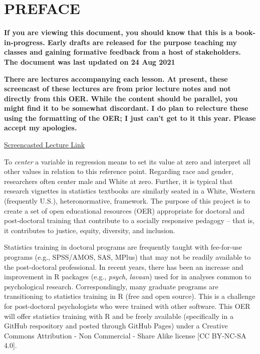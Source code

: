 \documentclass[
  english,
]{book}
\begin{document}
\hypertarget{preface}{%
\chapter*{PREFACE}\label{preface}}

\textbf{If you are viewing this document, you should know that this is a book-in-progress. Early drafts are released for the purpose teaching my classes and gaining formative feedback from a host of stakeholders. The document was last updated on 24 Aug 2021}

\textbf{There are lectures accompanying each lesson. At present, these screencast of these lectures are from prior lecture notes and not directly from this OER. While the content should be parallel, you might find it to be somewhat discordant. I do plan to relecture these using the formatting of the OER; I just can't get to it this year. Please accept my apologies.}

\href{https://spu.hosted.panopto.com/Panopto/Pages/Viewer.aspx?id=c932455e-ef06-444a-bdca-acf7012d759a}{Screencasted Lecture Link}

To \emph{center} a variable in regression means to set its value at zero and interpret all other values in relation to this reference point. Regarding race and gender, researchers often center male and White at zero. Further, it is typical that research vignettes in statistics textbooks are similarly seated in a White, Western (frequently U.S.), heteronormative, framework. The purpose of this project is to create a set of open educational resources (OER) appropriate for doctoral and post-doctoral training that contribute to a socially responsive pedagogy -- that is, it contributes to justice, equity, diversity, and inclusion.

Statistics training in doctoral programs are frequently taught with fee-for-use programs (e.g., SPSS/AMOS, SAS, MPlus) that may not be readily available to the post-doctoral professional. In recent years, there has been an increase and improvement in R packages (e.g., \emph{psych}, \emph{lavaan}) used for in analyses common to psychological research. Correspondingly, many graduate programs are transitioning to statistics training in R (free and open source). This is a challenge for post-doctoral psychologists who were trained with other software. This OER will offer statistics training with R and be freely available (specifically in a GitHub respository and posted through GitHub Pages) under a Creative Commons Attribution - Non Commercial - Share Alike license {[}CC BY-NC-SA 4.0{]}.
\end{document}
